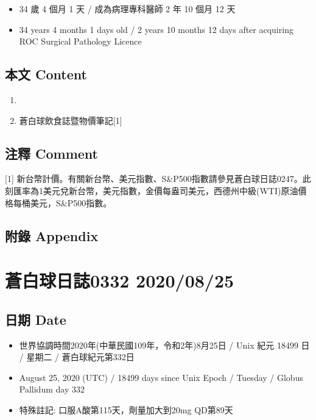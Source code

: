 \documentclass[a5paper, 11pt
]{book}
\providecommand{\tightlist}{%
  \setlength{\itemsep}{0pt}\setlength{\parskip}{0pt}}
\begin{document}
\begin{itemize}
\tightlist
\item
  34 歲 4 個月 1 天 / 成為病理專科醫師 2 年 10 個月 12 天
\item
  34 years 4 months 1 days old / 2 years 10 months 12 days after
  acquiring ROC Surgical Pathology Licence
\end{itemize}

\hypertarget{ux672cux6587-content-84}{%
\subsection{本文 Content}\label{ux672cux6587-content-84}}

\begin{enumerate}
\def\labelenumi{\arabic{enumi}.}
\tightlist
\item
\item
  蒼白球飲食誌暨物價筆記{[}1{]}
\end{enumerate}

\hypertarget{ux6ce8ux91cb-comment-84}{%
\subsection{注釋 Comment}\label{ux6ce8ux91cb-comment-84}}

{[}1{]}
新台幣計價。有關新台幣、美元指數、S\&P500指數請參見蒼白球日誌0247。此刻匯率為1美元兌新台幣，美元指數，金價每盎司美元，西德州中級(WTI)原油價格每桶美元，S\&P500指數。

\hypertarget{ux9644ux9304-appendix-84}{%
\subsection{附錄 Appendix}\label{ux9644ux9304-appendix-84}}

\hypertarget{ux84bcux767dux7403ux65e5ux8a8c0332-20200825}{%
\section{蒼白球日誌0332
2020/08/25}\label{ux84bcux767dux7403ux65e5ux8a8c0332-20200825}}

\hypertarget{ux65e5ux671f-date-85}{%
\subsection{日期 Date}\label{ux65e5ux671f-date-85}}

\begin{itemize}
\tightlist
\item
  世界協調時間2020年(中華民國109年，令和2年)8月25日 / Unix 紀元 18499 日
  / 星期二 / 蒼白球紀元第332日
\item
  August 25, 2020 (UTC) / 18499 days since Unix Epoch / Tuesday / Globus
  Pallidum day 332
\item
  特殊註記: 口服A酸第115天，劑量加大到20mg QD第89天
\end{itemize}
\end{document}
